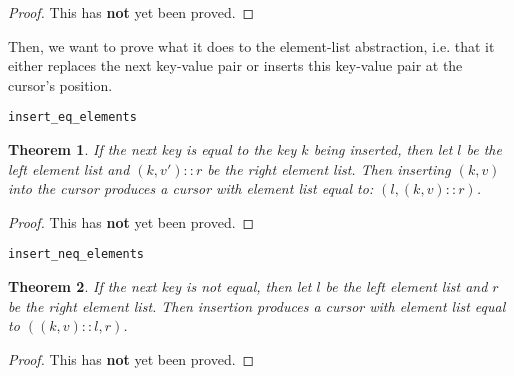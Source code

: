 \documentclass[12pt]{article}
\newtheorem{theorem}{Theorem}
\begin{document}
\begin{proof}
This has \textbf{not} yet been proved.
\end{proof}

Then, we want to prove what it does to the element-list abstraction, i.e. that it either replaces the next key-value pair or inserts this key-value pair at the cursor's position.

\bigskip
\texttt{insert\_eq\_elements}

\begin{theorem}
If the next key is equal to the key $k$ being inserted, then let $l$ be the left element list and $(k,v')::r$ be the right element list. Then inserting $(k,v)$ into the cursor produces a cursor with element list equal to: $(l,(k,v)::r)$.
\end{theorem}

\begin{proof}
This has \textbf{not} yet been proved.
\end{proof}

\bigskip
\texttt{insert\_neq\_elements}

\begin{theorem}
If the next key is not equal, then let $l$ be the left element list and $r$ be the right element list. Then insertion produces a cursor with element list equal to $((k,v)::l,r)$.
\end{theorem}

\begin{proof}
This has \textbf{not} yet been proved.
\end{proof}

\end{document}
